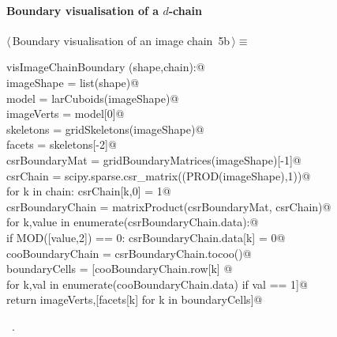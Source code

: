 \documentclass[11pt,oneside]{article}	%
\begin{document}
\paragraph{Boundary visualisation of a $d$-chain}

\begin{flushleft} \small
\begin{minipage}{\linewidth} \label{scrap10}
\protect{}$\langle\,$Boundary visualisation of an image chain\nobreak\ {\footnotesize 5b}$\,\rangle\equiv$
\vspace{-1ex}
\begin{list}{}{} \item
\mbox{}\verb@def visImageChainBoundary (shape,chain):@\\
\mbox{}\verb@   imageShape = list(shape)@\\
\mbox{}\verb@   model = larCuboids(imageShape)@\\
\mbox{}\verb@   imageVerts = model[0]@\\
\mbox{}\verb@   skeletons = gridSkeletons(imageShape)@\\
\mbox{}\verb@   facets = skeletons[-2]@\\
\mbox{}\verb@   csrBoundaryMat = gridBoundaryMatrices(imageShape)[-1]@\\
\mbox{}\verb@   csrChain = scipy.sparse.csr_matrix((PROD(imageShape),1))@\\
\mbox{}\verb@   for k in chain: csrChain[k,0] = 1@\\
\mbox{}\verb@   csrBoundaryChain = matrixProduct(csrBoundaryMat, csrChain)@\\
\mbox{}\verb@   for k,value in enumerate(csrBoundaryChain.data):@\\
\mbox{}\verb@      if MOD([value,2]) == 0: csrBoundaryChain.data[k] = 0@\\
\mbox{}\verb@   cooBoundaryChain = csrBoundaryChain.tocoo()@\\
\mbox{}\verb@   boundaryCells = [cooBoundaryChain.row[k] @\\
\mbox{}\verb@      for k,val in enumerate(cooBoundaryChain.data) if val == 1]@\\
\mbox{}\verb@   return imageVerts,[facets[k] for k in boundaryCells]@\\
\mbox{}\verb@@{\NWsep}
\end{list}
\vspace{-1ex}
\footnotesize\addtolength{\baselineskip}{-1ex}
\begin{list}{}{\setlength{\itemsep}{-\parsep}\setlength{\itemindent}{-\leftmargin}}
\item \NWtxtMacroRefIn\ .
\end{list}
\end{minipage}\\[4ex]
\end{flushleft}
\end{document}
